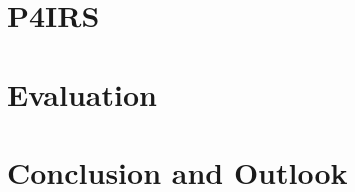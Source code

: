 \documentclass[preprint,12pt]{elsarticle}
\begin{document}

\section{P4IRS}
\label{sec:pairs}


\section{Evaluation}
\label{sec:evaluation}




\section{Conclusion and Outlook}
\label{sec:conclusion}






\begin{thebibliography}{00}


\bibitem[ ()]{}

\end{thebibliography}
\end{document}
